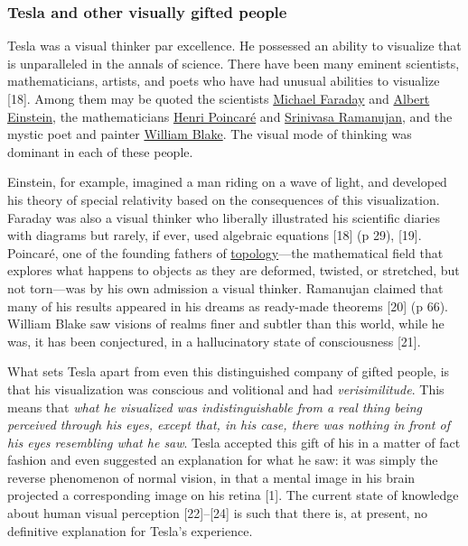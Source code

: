 \documentclass[
  11pt,
  a4paper,
]{article}
\begin{document}
\hypertarget{tesla-and-other-visually-gifted-people}{%
\subsubsection{Tesla and other visually gifted
people}\label{tesla-and-other-visually-gifted-people}}

Tesla was a visual thinker par excellence. He possessed an ability to
visualize that is unparalleled in the annals of science. There have been
many eminent scientists, mathematicians, artists, and poets who have had
unusual abilities to visualize {[}18{]}. Among them may be quoted the
scientists \href{https://en.wikipedia.org/wiki/Michael_Faraday}{Michael
Faraday} and \href{https://en.wikipedia.org/wiki/Albert_Einstein}{Albert
Einstein}, the mathematicians
\href{https://en.wikipedia.org/wiki/Henri_Poincar\%C3\%A9}{Henri
Poincaré} and
\href{https://en.wikipedia.org/wiki/Srinivasa_Ramanujan}{Srinivasa
Ramanujan}, and the mystic poet and painter
\href{https://en.wikipedia.org/wiki/William_Blake}{William Blake}. The
visual mode of thinking was dominant in each of these people.

Einstein, for example, imagined a man riding on a wave of light, and
developed his theory of special relativity based on the consequences of
this visualization. Faraday was also a visual thinker who liberally
illustrated his scientific diaries with diagrams but rarely, if ever,
used algebraic equations {[}18{]} (p 29), {[}19{]}. Poincaré, one of the
founding fathers of
\href{https://mathworld.wolfram.com/Topology.html}{topology}---the
mathematical field that explores what happens to objects as they are
deformed, twisted, or stretched, but not torn---was by his own admission
a visual thinker. Ramanujan claimed that many of his results appeared in
his dreams as ready-made theorems {[}20{]} (p 66). William Blake saw
visions of realms finer and subtler than this world, while he was, it
has been conjectured, in a hallucinatory state of consciousness
{[}21{]}.

What sets Tesla apart from even this distinguished company of gifted
people, is that his visualization was conscious and volitional and had
\emph{verisimilitude}. This means that \emph{what he visualized was
indistinguishable from a real thing being perceived through his eyes,
except that, in his case, there was nothing in front of his eyes
resembling what he saw}. Tesla accepted this gift of his in a matter of
fact fashion and even suggested an explanation for what he saw: it was
simply the reverse phenomenon of normal vision, in that a mental image
in his brain projected a corresponding image on his retina {[}1{]}. The
current state of knowledge about human visual perception
{[}22{]}--{[}24{]} is such that there is, at present, no definitive
explanation for Tesla's experience.
\end{document}
